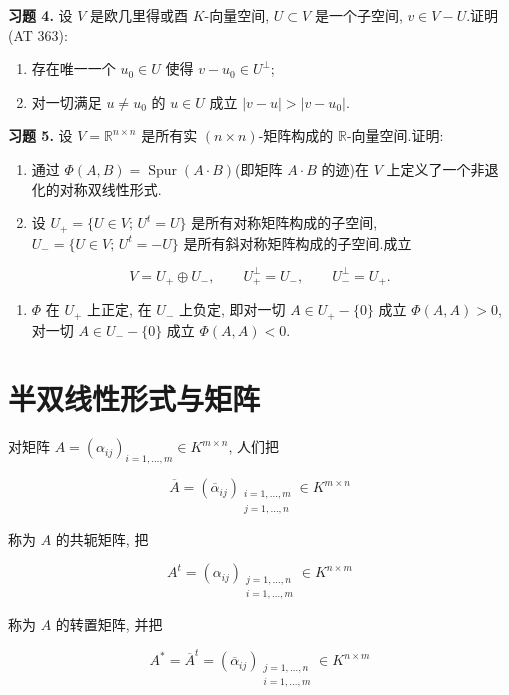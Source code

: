 \medskip
\noindent\textbf{习题 4.} 设 $V$ 是欧几里得或酉 $K$-向量空间, $U \subset V$ 是一个子空间, $v \in V - U$.证明 (AT 363):
\begin{enumerate}
\item[(i)] 存在唯一一个 $u_0 \in U$ 使得 $v - u_0 \in U^{\perp}$;
\item[(ii)] 对一切满足 $u \neq u_0$ 的 $u \in U$ 成立 $|v - u| > |v - u_0|$.
\end{enumerate}

\medskip
\noindent\textbf{习题 5.} 设 $V = \mathbb{R}^{n \times n}$ 是所有实 $(n \times n)$-矩阵构成的 $\mathbb{R}$-向量空间.证明:
\begin{enumerate}
\item[(i)] 通过 $\varPhi(A, B) = \operatorname{Spur}(A \cdot B)$(即矩阵 $A \cdot B$ 的迹)在 $V$ 上定义了一个非退化的对称双线性形式.
\item[(ii)] 设 $U_{+} = \{U \in V;\, U^t = U\}$ 是所有对称矩阵构成的子空间, $U_{-} = \{U \in V;\, U^t = -U\}$ 是所有斜对称矩阵构成的子空间.成立
\end{enumerate}

\[
V = U_{+} \oplus U_{-}, \qquad U_{+}^{\perp} = U_{-}, \qquad U_{-}^{\perp} = U_{+}\text{.}
\]

\begin{enumerate}
\item[(iii)] $\varPhi$ 在 $U_{+}$ 上正定, 在 $U_{-}$ 上负定, 即对一切 $A \in U_{+} - \{0\}$ 成立 $\varPhi(A, A) > 0$, 对一切 $A \in U_{-} - \{0\}$ 成立 $\varPhi(A, A) < 0$.
\end{enumerate}

\section{半双线性形式与矩阵}\label{sec:7.3}

对矩阵 $A = (\alpha_{ij})_{i = 1, \ldots, m} \in K^{m \times n}$, 人们把

\[
\overline{A} = (\overline{\alpha}_{ij})_{\substack{i = 1, \ldots, m\\ j = 1, \ldots, n}} \in K^{m \times n}
\]

称为 $A$ 的共轭矩阵, 把

\[
A^{t} = (\alpha_{ij})_{\substack{j = 1, \ldots, n\\ i = 1, \ldots, m}} \in K^{n \times m}
\]

称为 $A$ 的转置矩阵, 并把

\[
A^{*} = \overline{A}^{t} = (\overline{\alpha}_{ij})_{\substack{j = 1, \ldots, n\\ i = 1, \ldots, m}} \in K^{n \times m}
\]


